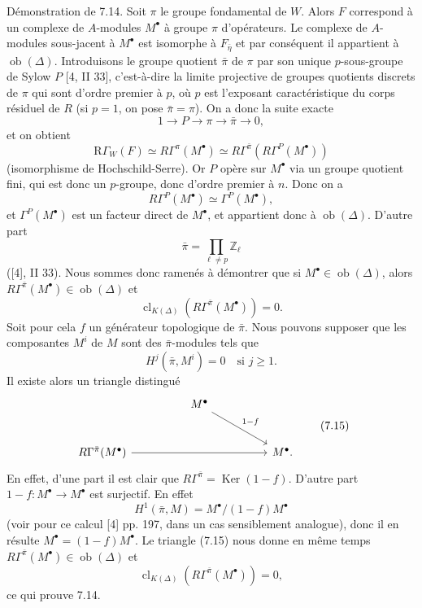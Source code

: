 \documentclass[11pt]{article}
\providecommand{\Ker}{\operatorname{Ker}}
\providecommand{\Ob}{\operatorname{ob}}
\providecommand{\Ker}{\operatorname{Ker}}
\providecommand{\Ker}{\operatorname{Ker}}
\providecommand{\Ob}{\operatorname{ob}}
\providecommand{\Ob}{\operatorname{Ob}}
\providecommand{\clK}[1]{\operatorname{cl}_{K(#1)}}
\providecommand{\RG}{\mathrm R\Gamma}
\begin{document}
Démonstration de 7.14. Soit $\pi$ le groupe fondamental de $W$. Alors $F$ correspond à un complexe de $A$-modules $M^\bullet$ à groupe $\pi$ d'opérateurs. Le complexe de $A$-modules sous-jacent à $M^\bullet$ est isomorphe à $F_{\bar\eta}$ et par conséquent il appartient à $\Ob(\Delta)$. Introduisons le groupe quotient $\bar\pi$ de $\pi$ par son unique $p$-sous-groupe de Sylow $P$ [4, II 33], c'est-à-dire la limite projective de groupes quotients discrets de $\pi$ qui sont d'ordre premier à $p$, où $p$ est l'exposant caractéristique du corps résiduel de $R$ (si $p=1$, on pose $\bar\pi=\pi$). On a donc la suite exacte
\[
1\longrightarrow P\longrightarrow \pi\longrightarrow \bar\pi\longrightarrow0,
\]
et on obtient
\[
\RG_W(F)\simeq R\Gamma^\pi(M^\bullet)
\simeq R\Gamma^{\bar\pi}(R\Gamma^P(M^\bullet))
\]
(isomorphisme de Hochschild-Serre). Or $P$ opère sur $M^\bullet$ via un groupe quotient fini, qui est donc un $p$-groupe, donc d'ordre premier à $n$. Donc on a
\[
R\Gamma^P(M^\bullet)\simeq \Gamma^P(M^\bullet),
\]
et $\Gamma^P(M^\bullet)$ est un facteur direct de $M^\bullet$, et appartient donc à $\Ob(\Delta)$. D'autre part
\[
\bar\pi=\prod_{\ell\ne p}\mathbb Z_\ell
\]
([4], II 33). Nous sommes donc ramenés à démontrer que si $M^\bullet\in\Ob(\Delta)$, alors $R\Gamma^{\bar\pi}(M^\bullet)\in\Ob(\Delta)$ et
\[
\clK{\Delta}(R\Gamma^{\bar\pi}(M^\bullet))=0.
\]
Soit pour cela $f$ un générateur topologique de $\bar\pi$. Nous pouvons supposer que les composantes $M^i$ de $M$ sont des $\bar\pi$-modules tels que
\[
H^j(\bar\pi,M^i)=0\quad\text{si }j\ge1.
\]
Il existe alors un triangle distingué
\[
\begin{tikzcd}[column sep=huge,row sep=large]
& M^\bullet \arrow[dr,"1-f"] &\\
R\Gamma^{\bar\pi}(M^\bullet) \arrow[rr] && M^\bullet .
\end{tikzcd}
\tag{7.15}
\]
En effet, d'une part il est clair que $R\Gamma^{\bar\pi}=\Ker(1-f)$. D'autre part $1-f:M^\bullet\to M^\bullet$ est surjectif. En effet
\[
H^1(\bar\pi,M)=M^\bullet/(1-f)M^\bullet
\]
(voir pour ce calcul [4] pp. 197, dans un cas sensiblement analogue), donc il en résulte $M^\bullet=(1-f)M^\bullet$. Le triangle (7.15) nous donne en même temps $R\Gamma^{\bar\pi}(M^\bullet)\in\Ob(\Delta)$ et
\[
\clK{\Delta}(R\Gamma^{\bar\pi}(M^\bullet))=0,
\]
ce qui prouve 7.14.
\end{document}
